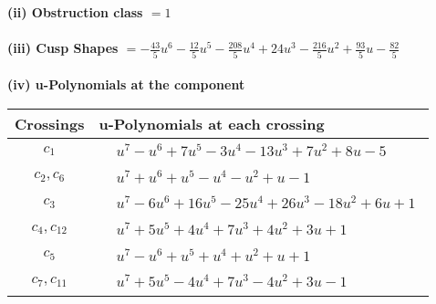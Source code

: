 \documentclass[1p]{elsarticle_modified}
\theoremstyle{definition}
\begin{document}
\flushleft \textbf{(ii) Obstruction class $= 1$}\\~\\
\flushleft \textbf{(iii) Cusp Shapes $= -\frac{43}{5} u^6-\frac{12}{5} u^5-\frac{208}{5} u^4+24 u^3-\frac{216}{5} u^2+\frac{93}{5} u-\frac{82}{5}$}\\~\\
\newpage\renewcommand{\arraystretch}{1}
\flushleft \textbf{(iv) u-Polynomials at the component}\newline \\
\begin{tabular}{m{50pt}|m{274pt}}
Crossings & \hspace{64pt}u-Polynomials at each crossing \\
\hline $$\begin{aligned}c_{1}\end{aligned}$$&$\begin{aligned}
&u^7- u^6+7 u^5-3 u^4-13 u^3+7 u^2+8 u-5
\end{aligned}$\\
\hline $$\begin{aligned}c_{2},c_{6}\end{aligned}$$&$\begin{aligned}
&u^7+u^6+u^5- u^4- u^2+u-1
\end{aligned}$\\
\hline $$\begin{aligned}c_{3}\end{aligned}$$&$\begin{aligned}
&u^7-6 u^6+16 u^5-25 u^4+26 u^3-18 u^2+6 u+1
\end{aligned}$\\
\hline $$\begin{aligned}c_{4},c_{12}\end{aligned}$$&$\begin{aligned}
&u^7+5 u^5+4 u^4+7 u^3+4 u^2+3 u+1
\end{aligned}$\\
\hline $$\begin{aligned}c_{5}\end{aligned}$$&$\begin{aligned}
&u^7- u^6+u^5+u^4+u^2+u+1
\end{aligned}$\\
\hline $$\begin{aligned}c_{7},c_{11}\end{aligned}$$&$\begin{aligned}
&u^7+5 u^5-4 u^4+7 u^3-4 u^2+3 u-1
\end{aligned}$\\

\end{tabular}
\end{document}
